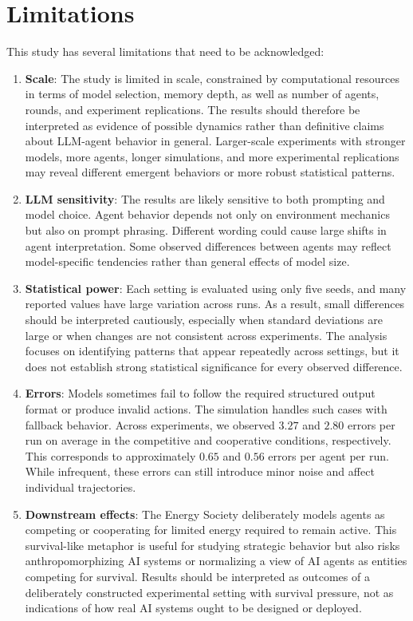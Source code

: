 \documentclass[sigconf,nonacm]{acmart}
\begin{document}
\section{Limitations}
This study has several limitations that need to be acknowledged:
\begin{enumerate}
    \item \textbf{Scale}: 
    The study is limited in scale, constrained by computational resources in terms of model selection, memory depth, as well as number of agents, rounds, and experiment replications. The results should therefore be interpreted as evidence of possible dynamics rather than definitive claims about LLM-agent behavior in general. 
    Larger-scale experiments with stronger models, more agents, longer simulations, and more experimental replications may reveal different emergent behaviors or more robust statistical patterns.

    \item \textbf{LLM sensitivity}: 
    The results are likely sensitive to both prompting and model choice. Agent behavior depends not only on environment mechanics but also on prompt phrasing. Different wording could cause large shifts in agent interpretation.
    Some observed differences between agents may reflect model-specific tendencies rather than general effects of model size.
    
    \item \textbf{Statistical power}: 
    Each setting is evaluated using only five seeds, and many reported values have large variation across runs. As a result, small differences should be interpreted cautiously, especially when standard deviations are large or when changes are not consistent across experiments. The analysis focuses on identifying patterns that appear repeatedly across settings, but it does not establish strong statistical significance for every observed difference.
    
    \item \textbf{Errors}: 
    Models sometimes fail to follow the required structured output format or produce invalid actions. The simulation handles such cases with fallback behavior. Across experiments, we observed \(3.27\) and \(2.80\) errors per run on average in the competitive and cooperative conditions, respectively. This corresponds to approximately \(0.65\) and \(0.56\) errors per agent per run. While infrequent, these errors can still introduce minor noise and affect individual trajectories.
    
    \item \textbf{Downstream effects}: 
    The Energy Society deliberately models agents as competing or cooperating for limited energy required to remain active. This survival-like metaphor is useful for studying strategic behavior but also risks anthropomorphizing AI systems or normalizing a view of AI agents as entities competing for survival. Results should be interpreted as outcomes of a deliberately constructed experimental setting with survival pressure, not as indications of how real AI systems ought to be designed or deployed.
\end{enumerate}
\end{document}
